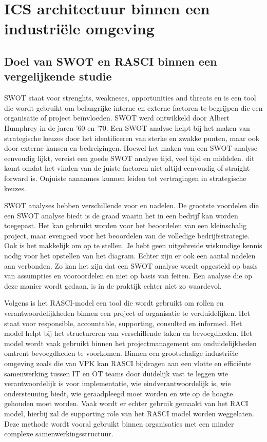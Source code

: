 \section{ICS architectuur binnen een industriële omgeving}

\subsection{Doel van SWOT en RASCI binnen een vergelijkende studie}
SWOT staat voor strenghts, weakneses, opportunities and threats en is een tool die wordt gebruikt om belangrijke interne en externe factoren te begrijpen die een organisatie of project beïnvloeden. SWOT werd ontwikkeld door Albert Humphrey in de jaren '60 en '70. Een SWOT analyse helpt bij het maken van strategische keuzes door het identificeren van sterke en zwakke punten, maar ook door externe kansen en bedreigingen. Hoewel het maken van een SWOT analyse eenvoudig lijkt, vereist een goede SWOT analyse tijd, veel tijd en middelen. dit komt omdat het vinden van de juiste factoren niet altijd eenvoudig of straight forward is. Onjuiste aannames kunnen leiden tot vertragingen in strategische keuzes.\autocite{cipd2025}

SWOT analyses hebben verschillende voor en nadelen. De grootste voordelen die een SWOT analyse biedt is de graad waarin het in een bedrijf kan worden toegepast. Het kan gebruikt worden voor het beoordelen van een kleinschalig project, maar evengoed voor het beoordelen van de volledige bedrijfsstrategie. Ook is het makkelijk om op te stellen. Je hebt geen uitgebreide wiskundige kennis nodig voor het opstellen van het diagram. Echter zijn er ook een aantal nadelen aan verbonden. Zo kan het zijn dat een SWOT analyse wordt opgesteld op basis van assumpties en vooroordelen en niet op basis van feiten. Een analyse die op deze manier wordt gedaan, is in de praktijk echter niet zo waardevol. \autocite{sarsby2012}


Volgens \textcite{putman2024} is het RASCI-model een tool die wordt gebruikt om rollen en verantwoordelijkheden binnen een project of organisatie te verduidelijken. Het staat voor responsible, accountable, supporting, consulted en informed. Het model helpt bij het structureren van verschillende taken en bevoegdheden. Het model wordt vaak gebruikt binnen het projectmanagement om onduidelijkheden omtrent bevoegdheden te voorkomen. Binnen een grootschalige industriële omgeving zoals die van VPK kan RASCI bijdragen aan een vlotte en efficiënte samenwerking tussen IT en OT teams door duidelijk vast te leggen wie verantwoordelijk is voor implementatie, wie eindverantwoordelijk is, wie ondersteuning biedt, wie geraadpleegd moet worden en wie op de hoogte gehouden moet worden. Vaak wordt er echter gebruik gemaakt van het RACI model, hierbij zal de supporting role van het RASCI model worden weggelaten. Deze methode wordt vooral gebruikt binnen organisaties met een minder complexe samenwerkingsstructuur. \autocite{harkhoe2025}


